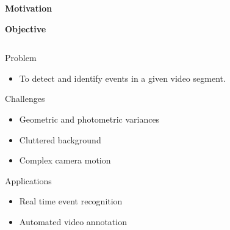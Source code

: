 \begin{frame}{\textbf{Motivation}}
\begin{figure}
\begin{subfigure}[c]{0.2\textwidth}
    \end{subfigure}
\end{figure}
\end{frame}

\begin{frame}{\textbf{Objective}}
	\begin{columns}
		\begin{column}{0.55\textwidth}
		\begin{varblock}[\textwidth]{Problem}
			\begin{itemize}
				\item To detect and identify events in a given video segment.
			\end{itemize}
		\end{varblock}
		\begin{varblock}[\textwidth]{Challenges}
			\begin{itemize}
				\item Geometric and photometric variances
				\item Cluttered	 background 
				\item Complex camera motion
			\end{itemize}
		\end{varblock}
		\begin{varblock}[\textwidth]{Applications}
			\begin{itemize}
				\item Real time event recognition
				\item Automated video annotation
			\end{itemize}
		\end{varblock}
		\end{column}
		\begin{column}{0.38\textwidth}
			\centering

\end{column}
\end{columns}
\end{frame}
